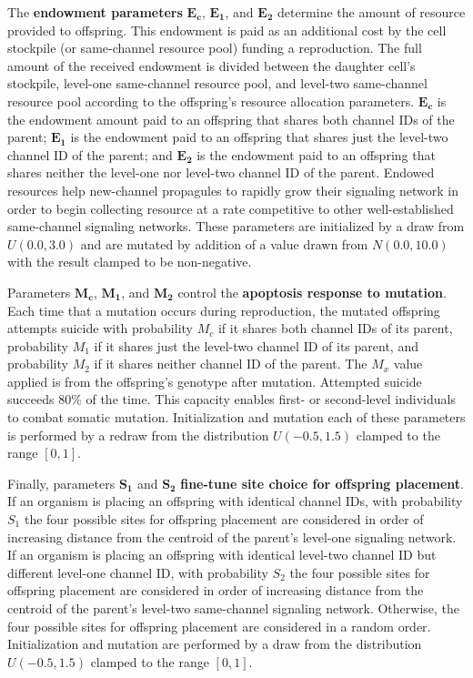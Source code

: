 {The \textbf{endowment parameters} $\bm{E_{c}}$, $\bm{E_1}$, and $\bm{E_2}$ determine the amount of resource provided to offspring.
This endowment is paid as an additional cost by the cell stockpile (or same-channel resource pool) funding a reproduction.
The full amount of the received endowment is divided between the daughter cell's stockpile, level-one same-channel resource pool, and level-two same-channel resource pool according to the offspring's resource allocation parameters.
$\bm{E_{c}}$ is the endowment amount paid to an offspring that shares both channel IDs of the parent;
$\bm{E_1}$ is the endowment paid to an offspring that shares just the level-two channel ID of the parent;
and $\bm{E_2}$ is the endowment paid to an offspring that shares neither the level-one nor level-two channel ID of the parent.
Endowed resources help new-channel propagules to rapidly grow their signaling network in order to begin collecting resource at a rate competitive to other well-established same-channel signaling networks.
These parameters are initialized by a draw from $U(0.0, 3.0)$ and are mutated by addition of a value drawn from $N(0.0,10.0)$ with the result clamped to be non-negative.


Parameters $\bm{M_{c}}$, $\bm{M_1}$, and $\bm{M_2}$ control the \textbf{apoptosis response to mutation}.
Each time that a mutation occurs during reproduction, the mutated offspring attempts suicide with probability $M_{c}$ if it shares both channel IDs of its parent, probability $M_1$ if it shares just the level-two channel ID of its parent, and probability $M_2$ if it shares neither channel ID of the parent.
The $M_x$ value applied is from the offspring's genotype after mutation.
Attempted suicide succeeds 80\% of the time.
This capacity enables first- or second-level individuals to combat somatic mutation.
Initialization and mutation each of these parameters is performed by a redraw from the distribution $U(-0.5,1.5)$ clamped to the range $[0,1]$.


Finally, parameters $\bm{S_1}$ and $\bm{S_2}$ \textbf{fine-tune site choice for offspring placement}.
If an organism is placing an offspring with identical channel IDs, with probability $S_1$ the four possible sites for offspring placement are considered in order of increasing distance from the centroid of the parent's level-one signaling network.
If an organism is placing an offspring with identical level-two channel ID but different level-one channel ID, with probability $S_2$ the four possible sites for offspring placement are considered in order of increasing distance from the centroid of the parent's level-two same-channel signaling network.
Otherwise, the four possible sites for offspring placement are considered in a random order.
Initialization and mutation are performed by a draw from the distribution $U(-0.5,1.5)$ clamped to the range $[0,1]$.

}
